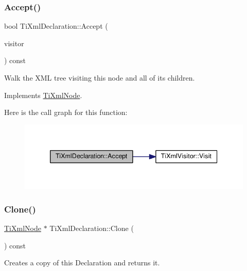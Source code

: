 \subsubsection{\texorpdfstring{Accept()}{Accept()}}
{\footnotesize\ttfamily bool Ti\+Xml\+Declaration\+::\+Accept (\begin{DoxyParamCaption}\item[{\hyperlink{class_ti_xml_visitor}{Ti\+Xml\+Visitor} $\ast$}]{visitor }\end{DoxyParamCaption}) const\hspace{0.3cm}{\ttfamily [virtual]}}

Walk the X\+ML tree visiting this node and all of its children. 

Implements \hyperlink{class_ti_xml_node_acc0f88b7462c6cb73809d410a4f5bb86}{Ti\+Xml\+Node}.

Here is the call graph for this function\+:\nopagebreak
\begin{figure}[H]
\begin{center}
\leavevmode
\includegraphics[width=339pt]{class_ti_xml_declaration_aa1b6bade6c989407ce9881bdfc73c1e6_cgraph}
\end{center}
\end{figure}
\mbox{\label{class_ti_xml_declaration_a35dc1455f69b79e81cae28e186944610}} 
\subsubsection{\texorpdfstring{Clone()}{Clone()}}
{\footnotesize\ttfamily \hyperlink{class_ti_xml_node}{Ti\+Xml\+Node} $\ast$ Ti\+Xml\+Declaration\+::\+Clone (\begin{DoxyParamCaption}{ }\end{DoxyParamCaption}) const\hspace{0.3cm}{\ttfamily [virtual]}}



Creates a copy of this Declaration and returns it. 



